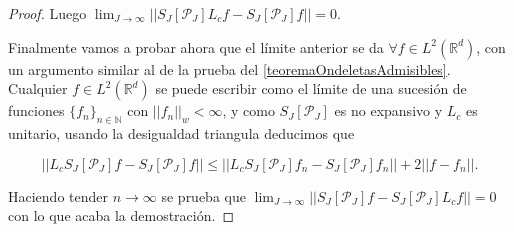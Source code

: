\begin{proof}
\noindent Luego $\lim_{J\rightarrow\infty}||S_J[\mathcal{P}_J] L_cf - S_J[\mathcal{P}_J]f ||=0$.

\medskip

\noindent Finalmente vamos a probar ahora que el límite anterior se da $\forall f \in L^2(\mathbb{R}^d)$, con un argumento similar al de la prueba del \autoref{teoremaOndeletasAdmisibles}. Cualquier $f\in L^2(\mathbb{R}^d)$ se puede escribir como el límite de una sucesión de funciones $\lbrace f_n \rbrace_{n\in\mathbb{N}}$ con $||f_n||_w < \infty$, y como $S_J[\mathcal{P}_J]$ es no expansivo y $L_c$ es unitario, usando la desigualdad triangula deducimos que 

$$||L_c S_J[\mathcal{P}_J]f-S_J[\mathcal{P}_J]f|| \leq ||L_c S_J [\mathcal{P}_J]f_n -S_J[\mathcal{P}_J]f_n|| + 2||f-f_n||.$$

\noindent Haciendo tender $n \rightarrow \infty$ se prueba que $\lim_{J\rightarrow \infty}||S_J[\mathcal{P}_J] f-S_J[\mathcal{P}_J] L_cf||=0$ con lo que acaba la demostración. \qedhere
\end{proof}


\endinput
